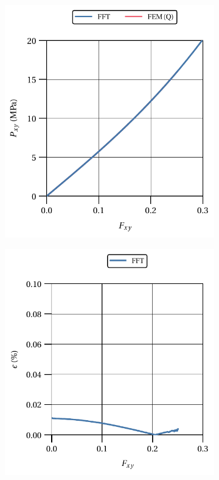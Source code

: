 \begin{figure}[hbt]
    \centering
  	\begin{subfigure}[b]{0.49\textwidth}
      \centering
      \includegraphics[width=\textwidth]{figures/svk_2D_shear_material_response}
      \caption{}
      \label{subfig:svk_2D_shear_material_response}
    \end{subfigure}
    \begin{subfigure}[b]{0.49\textwidth}
      \centering
      \includegraphics[width=\textwidth]{figures/svk_2D_shear_material_response_error}

\end{subfigure}
\end{figure}
